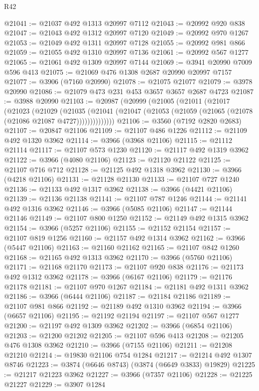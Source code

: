 \begin{lexlean}{R42}
\begin{coremodule}
@21041 := @21037 @492 @1313 @20997 @7112
@21043 := @20992 @920 @838
@21047 := @21043 @492 @1312 @20997 @7120
@21049 := @20992 @970 @1267
@21053 := @21049 @492 @1311 @20997 @7128
@21055 := @20992 @981 @866
@21059 := @21055 @492 @1310 @20997 @7136
@21061 := @20992 @567 @1277
@21065 := @21061 @492 @1309 @20997 @7144
@21069 := @3941 @20990 @7009 @596 @413
@21075 := @21069 @476 @1308 @2687 @20990 @20997 @7157
@21077 := @3906 (@7160 @20990)
@21078 := @21075 @21077
@21079 := @3978 @20990
@21086 := @21079 @473 @231 @453 @3657 @3657 @2687 @4723
@21087 := @3988 @20990
@21103 := @20987
    (@20999
      (@21005
        (@21011
          (@21017
            (@21023
              (@21029
                (@21035
                  (@21041 (@21047 (@21053 (@21059 (@21065 (@21078 (@21086 @21087 @4727))))))))))))))
@21106 := @3560 (@7192 @2820 @2683)
@21107 := @20847 @21106
@21109 := @21107 @486 @1226
@21112 := @21109 @492 @1320 @3962
@21114 := @3966 (@3968 @21106)
@21115 := @21112 @21114
@21117 := @21107 @573 @1230
@21120 := @21117 @492 @1319 @3962
@21122 := @3966 (@4080 @21106)
@21123 := @21120 @21122
@21125 := @21107 @716 @712
@21128 := @21125 @492 @1318 @3962
@21130 := @3966 (@4218 @21106)
@21131 := @21128 @21130
@21133 := @21107 @727 @1240
@21136 := @21133 @492 @1317 @3962
@21138 := @3966 (@4421 @21106)
@21139 := @21136 @21138
@21141 := @21107 @787 @1246
@21144 := @21141 @492 @1316 @3962
@21146 := @3966 (@5085 @21106)
@21147 := @21144 @21146
@21149 := @21107 @800 @1250
@21152 := @21149 @492 @1315 @3962
@21154 := @3966 (@5257 @21106)
@21155 := @21152 @21154
@21157 := @21107 @819 @1256
@21160 := @21157 @492 @1314 @3962
@21162 := @3966 (@5447 @21106)
@21163 := @21160 @21162
@21165 := @21107 @842 @1260
@21168 := @21165 @492 @1313 @3962
@21170 := @3966 (@5760 @21106)
@21171 := @21168 @21170
@21173 := @21107 @920 @838
@21176 := @21173 @492 @1312 @3962
@21178 := @3966 (@6167 @21106)
@21179 := @21176 @21178
@21181 := @21107 @970 @1267
@21184 := @21181 @492 @1311 @3962
@21186 := @3966 (@6444 @21106)
@21187 := @21184 @21186
@21189 := @21107 @981 @866
@21192 := @21189 @492 @1310 @3962
@21194 := @3966 (@6657 @21106)
@21195 := @21192 @21194
@21197 := @21107 @567 @1277
@21200 := @21197 @492 @1309 @3962
@21202 := @3966 (@6854 @21106)
@21203 := @21200 @21202
@21205 := @21107 @596 @413
@21208 := @21205 @476 @1308 @3962
@21210 := @3966 (@7155 @21106)
@21211 := @21208 @21210
@21214 := @19830 @21106 @754 @1284
@21217 := @21214 @492 @1307 @8746
@21223 := @3874 (@6646 @8743) (@3874 (@6649 @3833) @19829)
@21225 := @21217 @21223 @3962
@21227 := @3966 (@7357 @21106)
@21228 := @21225 @21227
@21229 := @3907 @1284

\end{coremodule}
\end{lexlean}
